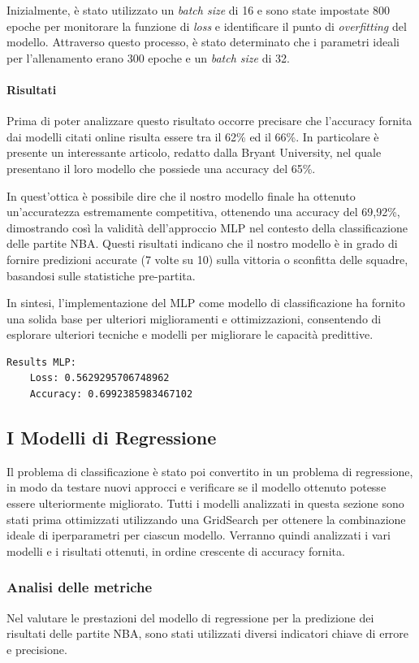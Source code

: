 \documentclass[a4paper]{article}
\numberwithin{equation}{section}
\begin{document}
Inizialmente, è stato utilizzato un \textit{batch size} di 16 e sono state impostate 800 epoche per monitorare la funzione di \textit{loss} e identificare il punto di \textit{overfitting} del modello. Attraverso questo processo, è stato determinato che i parametri ideali per l'allenamento erano 300 epoche e un \textit{batch size} di 32.

\paragraph{Risultati}
Prima di poter analizzare questo risultato occorre precisare che l'accuracy fornita dai modelli citati online risulta essere tra il 62\% ed il 66\%. In particolare è presente un interessante articolo, redatto dalla Bryant University, nel quale presentano il loro modello che possiede una accuracy del 65\%.

In quest'ottica è possibile dire che il nostro modello finale ha ottenuto un'accuratezza estremamente competitiva, ottenendo una accuracy del 69,92\%, dimostrando così la validità dell'approccio MLP nel contesto della classificazione delle partite NBA. Questi risultati indicano che il nostro modello è in grado di fornire predizioni accurate (7 volte su 10) sulla vittoria o sconfitta delle squadre, basandosi sulle statistiche pre-partita.

In sintesi, l'implementazione del MLP come modello di classificazione ha fornito una solida base per ulteriori miglioramenti e ottimizzazioni, consentendo di esplorare ulteriori tecniche e modelli per migliorare le capacità predittive.
\begin{lstlisting}
Results MLP:
    Loss: 0.5629295706748962
    Accuracy: 0.6992385983467102
\end{lstlisting}


\subsection{I Modelli di Regressione}
Il problema di classificazione è stato poi convertito in un problema di regressione, in modo da testare nuovi approcci e verificare se il modello ottenuto potesse essere ulteriormente migliorato.
Tutti i modelli analizzati in questa sezione sono stati prima ottimizzati utilizzando una GridSearch per ottenere la combinazione ideale di iperparametri per ciascun modello. Verranno quindi analizzati i vari modelli e i risultati ottenuti, in ordine crescente di accuracy fornita.

\subsubsection{Analisi delle metriche}
Nel valutare le prestazioni del modello di regressione per la predizione dei risultati delle partite NBA, sono stati utilizzati diversi indicatori chiave di errore e precisione.
\end{document}
